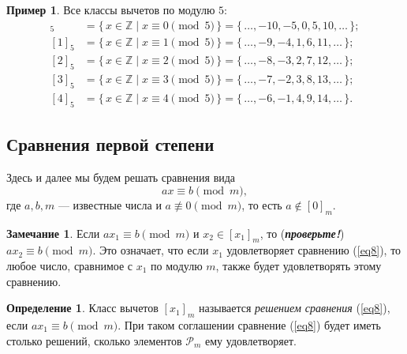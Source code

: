 \documentclass[14pt, a4paper]{extarticle}
\theoremstyle{definition}
\newtheorem*{definition}{Определение}
\newtheorem*{remark}{Замечание}
\newtheorem{example}{Пример}
\begin{document}
	\begin{example}
		Все классы вычетов по модулю $5$:
		\begin{align*}
			[0]_5&=\{\,x\in\mathbb{Z}\mid x\equiv 0\pmod{5}\,\}=\{\,\dots,-10,-5,0,5,10,\dots\,\};\\
			[1]_5&=\{\,x\in\mathbb{Z}\mid x\equiv 1\pmod{5}\,\}=\{\,\dots,-9,-4,1,6,11,\dots\,\};\\
			[2]_5&=\{\,x\in\mathbb{Z}\mid x\equiv 2\pmod{5}\,\}=\{\,\dots,-8,-3,2,7,12,\dots\,\};\\
			[3]_5&=\{\,x\in\mathbb{Z}\mid x\equiv 3\pmod{5}\,\}=\{\,\dots,-7,-2,3,8,13,\dots\,\};\\
			[4]_5&=\{\,x\in\mathbb{Z}\mid x\equiv 4\pmod{5}\,\}=\{\,\dots,-6,-1,4,9,14,\dots\,\}.
		\end{align*}
	\end{example}

\subsection{Сравнения первой степени}
\label{srx}

	Здесь и далее мы будем решать сравнения вида
	\begin{equation}
	\label{eq8}
		ax\equiv b\pmod{m},
	\end{equation}
	где $a,b,m$ --- известные числа и $a\not\equiv0\pmod{m}$, то есть $a\notin[0]_m$.
	
	\begin{remark}
		Если $ax_1\equiv b\pmod{m}$ и $x_2\in[x_1]_m$, то (\textbf{\textit{проверьте!}}) $ax_2\equiv b\pmod{m}$. Это означает, что если $x_1$ удовлетворяет сравнению (\ref{eq8}), то любое число, сравнимое с $x_1$ по модулю $m$, также будет удовлетворять этому сравнению.
	\end{remark}
	
	\begin{definition}
		Класс вычетов $[x_1]_m$ называется \emph{решением сравнения} (\ref{eq8}), если $ax_1\equiv b\pmod{m}$. При таком соглашении сравнение (\ref{eq8}) будет иметь столько решений, сколько элементов $\mathcal{P}_m$ ему удовлетворяет. 
	\end{definition}
\end{document}
